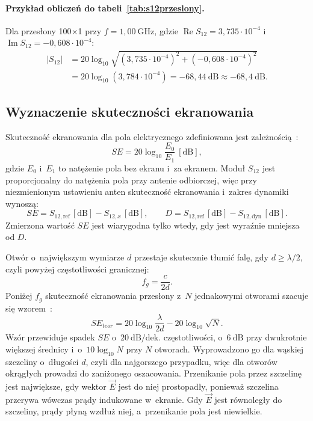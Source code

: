 \documentclass[11pt,a4paper]{article}
\begin{document}
\paragraph{Przykład obliczeń do tabeli~\ref{tab:s12przeslony}.} Dla przesłony 100$\times$1
przy $f = 1{,}00\ \mathrm{GHz}$, gdzie $\operatorname{Re} S_{12} = 3{,}735\cdot10^{-4}$
i~$\operatorname{Im} S_{12} = -0{,}608\cdot10^{-4}$:
\begin{align*}
  |S_{12}| &= 20\log_{10}\sqrt{(3{,}735\cdot10^{-4})^2+(-0{,}608\cdot10^{-4})^2}\\
  &= 20\log_{10}(3{,}784\cdot10^{-4}) = -68{,}44\ \mathrm{dB} \approx -68{,}4\ \mathrm{dB}.
\end{align*}

\subsection{Wyznaczenie skuteczności ekranowania}

Skuteczność ekranowania dla pola elektrycznego zdefiniowana jest zależnością~\cite[wzór~(1)]{instr}:
\begin{equation}
  SE = 20\log_{10}\frac{E_0}{E_1}\ [\mathrm{dB}],
  \label{eq:sedef}
\end{equation}
gdzie $E_0$ i~$E_1$ to natężenie pola bez ekranu i~za ekranem. Moduł $S_{12}$ jest
proporcjonalny do natężenia pola przy antenie odbiorczej, więc przy niezmienionym ustawieniu
anten skuteczność ekranowania i~zakres dynamiki wynoszą:
\begin{equation}
  SE = S_{12,\mathrm{ref}}\,[\mathrm{dB}] - S_{12,x}\,[\mathrm{dB}],
  \qquad
  D = S_{12,\mathrm{ref}}\,[\mathrm{dB}] - S_{12,\mathrm{dyn}}\,[\mathrm{dB}].
  \label{eq:se}
\end{equation}
Zmierzona wartość $SE$ jest wiarygodna tylko wtedy, gdy jest wyraźnie mniejsza od $D$.

Otwór o~największym wymiarze $d$ przestaje skutecznie tłumić falę, gdy $d \ge \lambda/2$, czyli powyżej
częstotliwości granicznej:
\begin{equation}
  f_g = \frac{c}{2d}.
  \label{eq:fg}
\end{equation}
Poniżej $f_g$ skuteczność ekranowania przesłony z~$N$ jednakowymi otworami szacuje się
wzorem~\cite[rozdz.~6]{ott}:
\begin{equation}
  SE_{teor} = 20\log_{10}\frac{\lambda}{2d} - 20\log_{10}\sqrt{N}.
  \label{eq:ott}
\end{equation}
Wzór przewiduje spadek $SE$ o~$20\ \mathrm{dB/dek.}$ częstotliwości, o~$6\ \mathrm{dB}$ przy
dwukrotnie większej średnicy i~o~$10\log_{10}N$ przy $N$ otworach. Wyprowadzono go dla
wąskiej szczeliny o~długości $d$, czyli dla najgorszego przypadku, więc dla otworów okrągłych
prowadzi do zaniżonego oszacowania. Przenikanie pola przez szczelinę jest największe, gdy wektor $\vec E$ jest do
niej prostopadły, ponieważ szczelina przerywa wówczas prądy indukowane w~ekranie. Gdy
$\vec E$ jest równoległy do szczeliny, prądy płyną wzdłuż niej, a~przenikanie pola jest
niewielkie.
\end{document}
